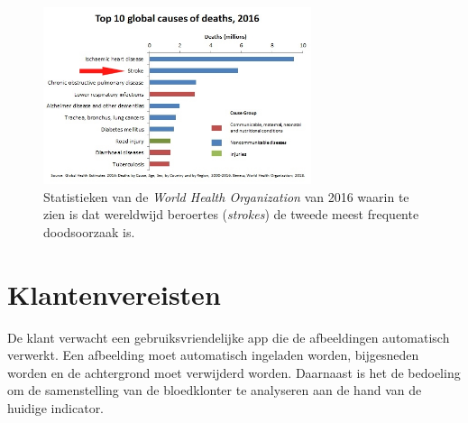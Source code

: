 \documentclass[a4paper,kulak]{kulakarticle}
\begin{document}
	\begin{figure}[H]
		\centering
		\includegraphics[width = 0.7\textwidth]{top10doodsoorzaken.png}
	
		\caption{Statistieken van de \textit{World Health Organization} van 2016 waarin te zien is dat wereldwijd beroertes (\textit{strokes}) de tweede meest frequente doodsoorzaak is.}
		\label{figuur doodsoorzaken}
	\end{figure}

\pagebreak
\newpage

\tableofcontents

\newpage

\section{Klantenvereisten}
De klant verwacht een gebruiksvriendelijke app die de afbeeldingen automatisch verwerkt. Een afbeelding moet automatisch ingeladen worden, bijgesneden worden en de achtergrond moet verwijderd worden. Daarnaast is het de bedoeling om de samenstelling van de bloedklonter te analyseren aan de hand van de huidige indicator.
\end{document}
